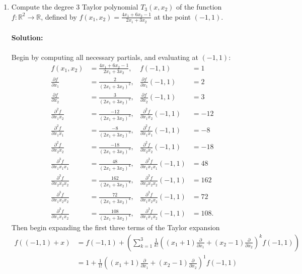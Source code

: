\documentclass{article}
\begin{document}
\begin{enumerate}
\item Compute the degree 3 Taylor polynomial $T_3(x,x_2)$ of the function $f: \mathbb{R}^2 \to \mathbb{R}$, defined by $f(x_1, x_2) = \frac{4x_1 + 6x_2 - 1}{2x_1 + 3x_2}$ at the point $(-1,1).$
    \paragraph{Solution: } Begin by computing all necessary partials, and evaluating at $(-1,1)$: 
    \begin{align*}
        f(x_1,x_2   )&= \frac{4x_1+6x_2-1}{2x_1+3x_2},&f(-1,1)&=1 \\
        \frac{\partial f}{\partial x_1} &= \frac{2}{(2x_1+3x_2)^2},& \frac{\partial f}{\partial x_1}(-1,1)&=2 \\
        \frac{\partial f}{\partial x_2} &= \frac{3}{(2x_1+3x_2)^2},& \frac{\partial f}{\partial x_2}(-1,1)&=3 \\
        \frac{\partial^2 f}{\partial x_1x_2} &= \frac{-12}{(2x_1+3x_2)^3},& \frac{\partial^2 f}{\partial x_1x_2}(-1,1)&=-12 \\
        \frac{\partial^2 f}{\partial x_1x_1} &= \frac{-8}{(2x_1+3x_2)^3},& \frac{\partial^2 f}{\partial x_1x_1}(-1,1)&=-8 \\
        \frac{\partial^2 f}{\partial x_2x_2} &= \frac{-18}{(2x_1+3x_2)^3},& \frac{\partial^2 f}{\partial x_2x_2}(-1,1)&=-18 \\
        \frac{\partial^3 f}{\partial x_1x_1x_1} &= \frac{48}{(2x_1+3x_2)^4},& \frac{\partial^3 f}{\partial x_1x_1x_1}(-1,1)&=48 \\
        \frac{\partial^3 f}{\partial x_2x_2x_2} &= \frac{162}{(2x_1+3x_2)^4},& \frac{\partial^3 f}{\partial x_2x_2x_2}(-1,1)&=162 \\
        \frac{\partial^3 f}{\partial x_1x_2x_2} &= \frac{72}{(2x_1+3x_2)^4},& \frac{\partial^3 f}{\partial x_1x_2x_2}(-1,1)&=72 \\
        \frac{\partial^3 f}{\partial x_1x_1x_2} &= \frac{108}{(2x_1+3x_2)^4},& \frac{\partial^3 f}{\partial x_1x_1x_2}(-1,1)&=108
    .\end{align*}
    Then begin expanding the first three terms of the Taylor expansion
    \begin{align*}
        f((-1,1)+x)&=f(-1,1)+\left(\sum\limits_{k=1}^{3}\frac{1}{k!}\left( (x_1+1)\frac{\partial }{\partial x_1} +(x_2-1)\frac{\partial }{\partial x_2}  \right) ^{k}f(-1,1)\right)\\
        &= 1+\frac{1}{1!}\left( (x_1+1)\frac{\partial }{\partial x_1} +(x_2-1)\frac{\partial }{\partial x_2}  \right) ^{1}f(-1,1)\\

\end{align*}
\end{enumerate}
\end{document}
